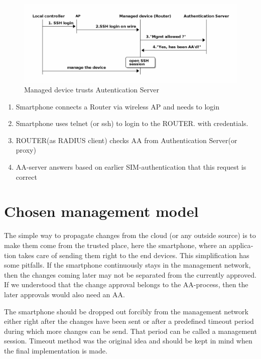 \documentclass[12pt,a4paper,english]{tutthesis}
\begin{document}
\begin{otherlanguage}{english}
\begin{figure}[htb]
\centering
\includegraphics[width=.9\linewidth]{trust-register.png}
\caption{\label{fig:trust-register}Managed device trusts Autentication Server}
\end{figure}





\begin{enumerate}
\item Smartphone connects a Router via wireless AP and needs to login
\item Smartphone uses telnet (or ssh) to login to the ROUTER.
with credentials.
\item ROUTER(as RADIUS client) checks AA from Authentication Server(or 
proxy)
\item AA-server answers based on earlier SIM-authentication that this
request is correct
\end{enumerate}



\section{Chosen management model}
\label{sec-4-5}





The simple way to propagate changes from the cloud (or any outside
source) is to make them come from the trusted place, here the smartphone,
where an application takes care of sending them right to the end
devices. This simplification has some pitfalls. If the smartphone continuously stays
in the management network, then the changes coming later may not be 
separated from the currently approved.
If we understood that the change approval belongs to the AA-process, then
the later approvals would also need an AA.

 The smartphone should be dropped out forcibly from the management
network either right after the changes have been sent or after a
predefined timeout period during which more changes can be send.  That
period can be called a management session.  Timeout method was the
original idea and should be kept in mind when the final implementation
is made.


\end{otherlanguage}
\end{document}
